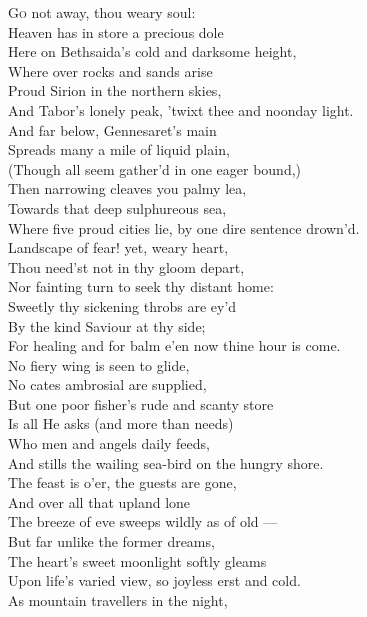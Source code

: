 \textsc{Go} not away, thou weary soul: \\
 Heaven has in store a precious dole \\
 Here on Bethsaida’s cold and darksome height, \\
 Where over rocks and sands arise \\
 Proud Sirion in the northern skies, \\
 And Tabor’s lonely peak, ’twixt thee and noonday light. \\
  And far below, Gennesaret’s main \\
 Spreads many a mile of liquid plain, \\
 (Though all seem gather’d in one eager bound,) \\
 Then narrowing cleaves you palmy lea, \\
 Towards that deep sulphureous sea, \\
 Where five proud cities lie, by one dire sentence drown’d. \\
  Landscape of fear! yet, weary heart, \\
 Thou need’st not in thy gloom depart, \\
 Nor fainting turn to seek thy distant home: \\
 Sweetly thy sickening throbs are ey’d \\
 By the kind Saviour at thy side; \\
 For healing and for balm e’en now thine hour is come. \\
  No fiery wing is seen to glide, \\
 No cates ambrosial are supplied, \\
 But one poor fisher’s rude and scanty store \\
 Is all He asks (and more than needs) \\
 Who men and angels daily feeds, \\
 And stills the wailing sea-bird on the hungry shore. \\
  The feast is o’er, the guests are gone, \\
 And over all that upland lone \\
 The breeze of eve sweeps wildly as of old — \\
 But far unlike the former dreams, \\
 The heart’s sweet moonlight softly gleams \\
 Upon life’s varied view, so joyless erst and cold. \\
  As mountain travellers in the night, \\
